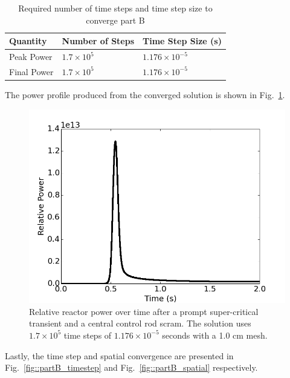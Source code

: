 \documentclass[12pt]{report}
\begin{document}
	\begin{table}[ht]
		\begin{center}
			\caption{\label{tab::timestepB} Required number of time steps and time step size to converge part B}
			\begin{tabular}{lll}
				\hline
				Quantity & Number of Steps & Time Step Size (s) \\
				\hline
				Peak Power & $1.7\times10^5$ &  $1.176 \times 10^{-5}$\\
				Final Power & $1.7\times10^5$ &  $1.176 \times 10^{-5}$\\
				\hline
			\end{tabular}
		\end{center}
	\end{table}


The power profile produced from the converged solution is shown in Fig.~\ref{fig::partB_power}.
	\begin{figure}[ht]
		\centering
		\includegraphics[width=.9\linewidth]{figs/partB_trans17.png}
		\caption{Relative reactor power over time after a prompt super-critical transient and a central control rod scram. The solution uses $1.7\times10^5$ time steps of  $1.176 \times 10^{-5}$ seconds with a 1.0 cm mesh.}
		\label{fig::partB_power}
	\end{figure}

Lastly, the time step and spatial convergence are presented in Fig.~\ref{fig::partB_timestep} and Fig.~\ref{fig::partB_spatial} respectively.
\end{document}
